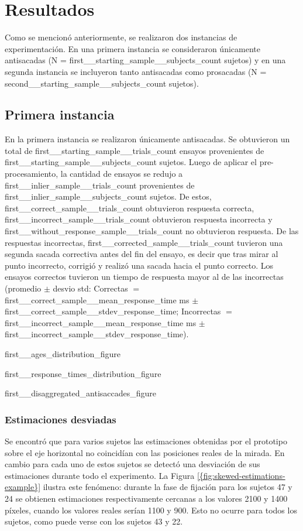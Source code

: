 \section{{Resultados}}

Como se mencionó anteriormente, se realizaron dos instancias de experimentación.
En una primera instancia se consideraron únicamente antisacadas (N =
{first__starting_sample__subjects_count} sujetos) y en una segunda
instancia se incluyeron tanto antisacadas como prosacadas (N =
{second__starting_sample__subjects_count} sujetos).

\subsection{{Primera instancia}}

En la primera instancia se realizaron únicamente antisacadas. Se obtuvieron un
total de {first__starting_sample__trials_count} ensayos provenientes de
{first__starting_sample__subjects_count} sujetos.
Luego de aplicar el pre-procesamiento, la cantidad de ensayos se redujo a
{first__inlier_sample__trials_count} provenientes de
{first__inlier_sample__subjects_count} sujetos.
De estos, {first__correct_sample__trials_count} obtuvieron respuesta correcta,
{first__incorrect_sample__trials_count} obtuvieron respuesta incorrecta y
{first__without_response_sample__trials_count} no obtuvieron respuesta.
De las respuestas incorrectas, {first__corrected_sample__trials_count} tuvieron
una segunda sacada correctiva antes del fin del ensayo, es decir que tras mirar
al punto incorrecto, corrigió y realizó una sacada hacia el punto correcto.
Los ensayos correctos tuvieron un tiempo de respuesta mayor al de las
incorrectas (promedio $\pm$ desvio std: Correctas $=$ 
{first__correct_sample__mean_response_time} ms $\pm$ 
{first__correct_sample__stdev_response_time}; Incorrectas $=$
{first__incorrect_sample__mean_response_time} ms $\pm$
{first__incorrect_sample__stdev_response_time}).

{first__ages_distribution_figure}

{first__response_times_distribution_figure}

{first__disaggregated_antisaccades_figure}

\subsubsection{{Estimaciones desviadas}} \label{{section:results:skewed_estimates}}

Se encontró que para varios sujetos las estimaciones obtenidas por el prototipo
sobre el eje horizontal no coincidían con las posiciones reales de la mirada.
En cambio para cada uno de estos sujetos se detectó una desviación de sus
estimaciones durante todo el experimento.
La Figura \ref{{fig:skewed-estimations-example}} ilustra este fenómeno:
durante la fase de fijación para los sujetos 47 y 24 se obtienen estimaciones
respectivamente cercanas a los valores 2100 y 1400 píxeles, cuando los valores
reales serían 1100 y 900.
Esto no ocurre para todos los sujetos, como puede verse con los sujetos 43 y 22.

